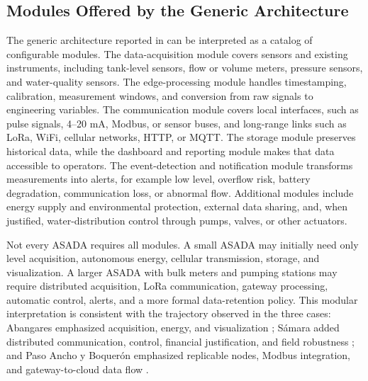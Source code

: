 \documentclass[conference]{IEEEtran}
\begin{document}
\subsection{Modules Offered by the Generic Architecture}
The generic architecture reported in \cite{Arguedas2025ModularArchitecture} can be interpreted as a catalog of configurable modules. The data-acquisition module covers sensors and existing instruments, including tank-level sensors, flow or volume meters, pressure sensors, and water-quality sensors. The edge-processing module handles timestamping, calibration, measurement windows, and conversion from raw signals to engineering variables. The communication module covers local interfaces, such as pulse signals, 4--20 mA, Modbus, or sensor buses, and long-range links such as LoRa, WiFi, cellular networks, HTTP, or MQTT. The storage module preserves historical data, while the dashboard and reporting module makes that data accessible to operators. The event-detection and notification module transforms measurements into alerts, for example low level, overflow risk, battery degradation, communication loss, or abnormal flow. Additional modules include energy supply and environmental protection, external data sharing, and, when justified, water-distribution control through pumps, valves, or other actuators.

Not every ASADA requires all modules. A small ASADA may initially need only level acquisition, autonomous energy, cellular transmission, storage, and visualization. A larger ASADA with bulk meters and pumping stations may require distributed acquisition, LoRa communication, gateway processing, automatic control, alerts, and a more formal data-retention policy. This modular interpretation is consistent with the trajectory observed in the three cases: Abangares emphasized acquisition, energy, and visualization \cite{Chavarria2021}; Sámara added distributed communication, control, financial justification, and field robustness \cite{Solorzano2021}; and Paso Ancho y Boquerón emphasized replicable nodes, Modbus integration, and gateway-to-cloud data flow \cite{Oviedo2024}.
\end{document}
